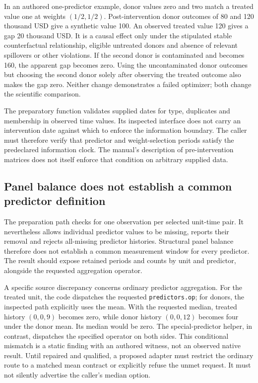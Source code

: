 In an authored one-predictor example, donor values zero and two match a
treated value one at weights $(1/2,1/2)$. Post-intervention donor outcomes
of 80 and 120 thousand USD give a synthetic value 100. An observed treated
value 120 gives a gap 20 thousand USD. It is a causal effect only under
the stipulated stable counterfactual relationship, eligible untreated
donors and absence of relevant spillovers or other violations. If the
second donor is contaminated and becomes 160, the apparent gap becomes
zero. Using the uncontaminated donor outcomes but choosing the second donor
solely after observing the treated outcome also makes the gap zero. Neither change demonstrates a failed optimizer;
both change the scientific comparison.
\citep{exec24_synth_choice}

The preparatory function validates supplied dates for type, duplicates
and membership in observed time values. Its inspected interface does not
carry an intervention date against which to enforce the information
boundary. The caller must therefore verify that predictor and
weight-selection periods satisfy the predeclared information clock.
The manual's description of pre-intervention matrices does not itself
enforce that condition on arbitrary supplied data.
\citep{exec24_synth_source,v12_sw_synth}

\subsection{Panel balance does not establish a common predictor definition}
The preparation path checks for one observation per selected unit-time
pair. It nevertheless allows individual predictor values to be missing,
reports their removal and rejects all-missing predictor histories.
Structural panel balance therefore does not establish a common measurement
window for every predictor. The result should expose retained periods and
counts by unit and predictor, alongside the requested aggregation operator.
\citep{exec24_synth_source}

A specific source discrepancy concerns ordinary predictor aggregation.
For the treated unit, the code dispatches the requested
\texttt{predictors.op}; for donors, the inspected path explicitly uses
the mean. With the requested median, treated history $(0,0,9)$ becomes
zero, while donor history $(0,0,12)$ becomes four under the donor mean.
Its median would be zero. The special-predictor helper, in contrast,
dispatches the specified operator on both sides. This conditional mismatch
is a static finding with an authored witness, not an observed native
result. Until repaired and qualified, a proposed adapter must restrict
the ordinary route to a matched mean contract or explicitly refuse the
unmet request. It must not silently advertise the caller's median option.
\citep{exec24_synth_source,exec24_synth_choice}

